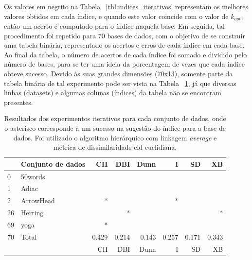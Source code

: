 Os valores em negrito na Tabela ~\ref{tbl:indices_iterativos} representam os melhores valores obtidos em cada índice, e quando este valor coincide com o valor de $k_{opt}$, então um acerto é computado para o índice naquela base. Em seguida, tal procedimento foi repetido para 70 bases de dados, com o objetivo de se construir uma tabela binária, representado os acertos e erros de cada índice em cada base. Ao final da tabela, o número de acertos de cada índice foi somado e dividido pelo número de bases, para se ter uma ideia da porcentagem de vezes que cada índice obteve sucesso. Devido às suas grandes dimensões (70x13), somente parte da tabela binária de tal experimento pode ser vista na Tabela ~\ref{tbl:indices_hits}, já que diversas linhas (datasets) e algumas colunas (índices) da tabela não se encontram presentes.

	\begin{table}[]
		\centering
		\caption{Resultados dos experimentos iterativos para cada conjunto de dados, onde o asterisco corresponde à um sucesso na sugestão do índice para a base de dados. Foi utilizado o algoritmo hierárquico com linkagem \emph{average} e métrica de dissimilaridade cid-euclidiana.}  \label{tbl:indices_hits} 
			\begin{tabular}{llrrrrrr}
				\toprule
				{} &                         Conjunto de dados &     CH &    DBI &   Dunn &      I &     SD &     XB \\
				\midrule
				0  &                         50words &    &    &    &    &    &   \\
				1  &                           Adiac &    &    &    &    &    &    \\
				2  &                       ArrowHead &  * &    &    &  * &    &  \\				
				26 &                         Herring &    &  * &    &    &    &  * \\			
				69 &                            yoga &  * &    &    &    &    &    \\
				 \rowcolor{lightgray} 70 &                           Total &  0.429 &  0.214 &  0.143 &  0.257 &  0.171 &  0.343\\
				 {} &                         {}  &     CH &    DBI &   Dunn &      I &     SD &     XB\\
			\bottomrule
		\end{tabular}
	\end{table}
	
